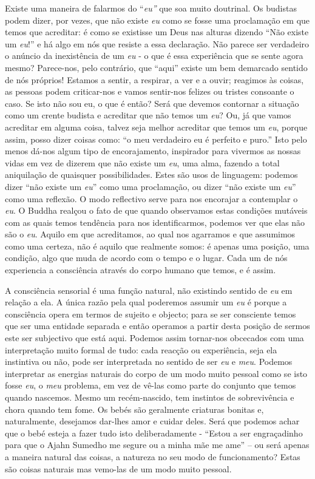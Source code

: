 Existe uma maneira de falarmos do ``\emph{eu''} que soa muito doutrinal.
Os budistas podem dizer, por vezes, que não existe \emph{eu} como se
fosse uma proclamação em que temos que acreditar: é como se existisse um
Deus nas alturas dizendo ``Não existe um \emph{eu}!'' e há algo em nós
que resiste a essa declaração. Não parece ser verdadeiro o anúncio da
inexistência de um \emph{eu} - o que é essa experiência que se sente
agora mesmo? Parece-nos, pelo contrário, que ``aqui'' existe um bem
demarcado sentido de nós próprios! Estamos a sentir, a respirar, a ver e
a ouvir; reagimos às coisas, as pessoas podem criticar-nos e vamos
sentir-nos felizes ou tristes consoante o caso. Se isto não sou eu, o
que é então? Será que devemos contornar a situação como um crente
budista e acreditar que não temos um \emph{eu}? Ou, já que vamos
acreditar em alguma coisa, talvez seja melhor acreditar que temos um
\emph{eu}, porque assim, posso dizer coisas como: ``o meu verdadeiro eu
é perfeito e puro.'' Isto pelo menos dá-nos algum tipo de encorajamento,
inspirador para vivermos as nossas vidas em vez de dizerem que não
existe um \emph{eu}, uma alma, fazendo a total aniquilação de quaisquer
possibilidades. Estes são usos de linguagem: podemos dizer ``não existe
um \emph{eu}'' como uma proclamação, ou dizer ``não existe um
\emph{eu}'' como uma reflexão. O modo reflectivo serve para nos
encorajar a contemplar o \emph{eu}. O Buddha realçou o fato de que
quando observamos estas condições mutáveis com as quais temos tendência
para nos identificarmos, podemos ver que elas não são o \emph{eu}.
Aquilo em que acreditamos, ao qual nos agarramos e que assumimos como
uma certeza, não é aquilo que realmente somos: é apenas uma posição, uma
condição, algo que muda de acordo com o tempo e o lugar. Cada um de nós
experiencia a consciência através do corpo humano que temos, e é assim.

A consciência sensorial é uma função natural, não existindo sentido de
\emph{eu} em relação a ela. A única razão pela qual poderemos assumir um
\emph{eu} é porque a consciência opera em termos de sujeito e objecto;
para se ser consciente temos que ser uma entidade separada e então
operamos a partir desta posição de sermos este ser subjectivo que está
aqui. Podemos assim tornar-nos obcecados com uma interpretação muito
formal de tudo: cada reacção ou experiência, seja ela instintiva ou não,
pode ser interpretada no sentido de ser \emph{eu} e \emph{meu}. Podemos
interpretar as energias naturais do corpo de um modo muito pessoal como
se isto fosse \emph{eu}, o \emph{meu} problema, em vez de vê-las como
parte do conjunto que temos quando nascemos. Mesmo um recém-nascido, tem
instintos de sobrevivência e chora quando tem fome. Os bebés são
geralmente criaturas bonitas e, naturalmente, desejamos dar-lhes amor e
cuidar deles. Será que podemos achar que o bebé esteja a fazer tudo isto
deliberadamente - ``Estou a ser engraçadinho para que o Ajahn Sumedho me
segure ou a minha mãe me ame'' -- ou será apenas a maneira natural das
coisas, a natureza no seu modo de funcionamento? Estas são coisas
naturais mas vemo-las de um modo muito pessoal.

